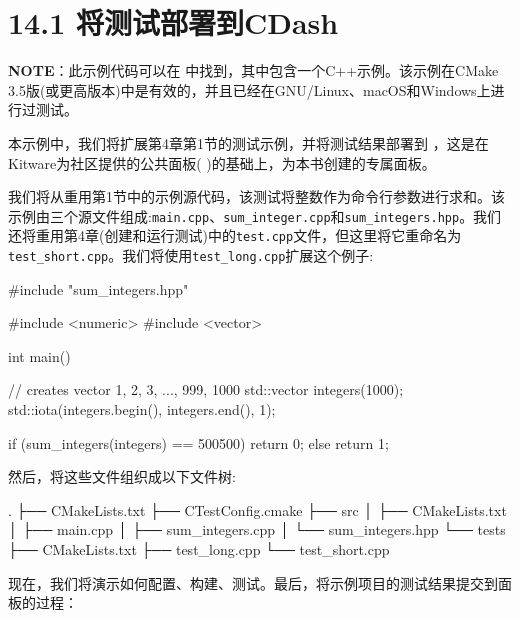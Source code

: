 \section{14.1 将测试部署到CDash}

\begin{myInfoBox}
\textbf{NOTE}：此示例代码可以在  中找到，其中包含一个C++示例。该示例在CMake 3.5版(或更高版本)中是有效的，并且已经在GNU/Linux、macOS和Windows上进行过测试。
\end{myInfoBox}

本示例中，我们将扩展第4章第1节的测试示例，并将测试结果部署到 ，这是在Kitware为社区提供的公共面板(  )的基础上，为本书创建的专属面板。


我们将从重用第1节中的示例源代码，该测试将整数作为命令行参数进行求和。该示例由三个源文件组成:\texttt{main.cpp}、\texttt{sum\_integer.cpp}和\texttt{sum\_integers.hpp}。我们还将重用第4章(创建和运行测试)中的\texttt{test.cpp}文件，但这里将它重命名为\texttt{test\_short.cpp}。我们将使用\texttt{test\_long.cpp}扩展这个例子:

\begin{codebox}[cpp]
#include "sum_integers.hpp"

#include <numeric>
#include <vector>

int main() {
  
  // creates vector {1, 2, 3, ..., 999, 1000}
  std::vector integers(1000);
  std::iota(integers.begin(), integers.end(), 1);

    if (sum_integers(integers) == 500500) {
    return 0;
  } else {
    return 1;
  }
}
\end{codebox}

然后，将这些文件组织成以下文件树:

\begin{codebox}[shell]
.
├── CMakeLists.txt
├── CTestConfig.cmake
├── src
│    ├── CMakeLists.txt
│    ├── main.cpp
│    ├── sum_integers.cpp
│    └── sum_integers.hpp
└── tests
    ├── CMakeLists.txt
    ├── test_long.cpp
    └── test_short.cpp
\end{codebox}


现在，我们将演示如何配置、构建、测试。最后，将示例项目的测试结果提交到面板的过程：

